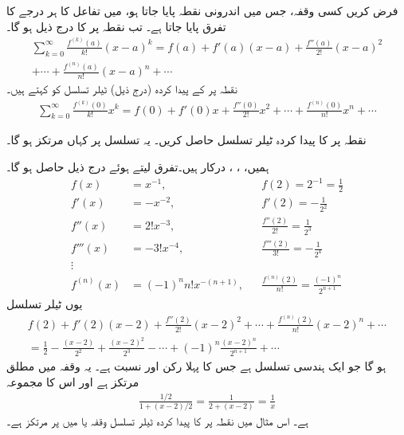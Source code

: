 فرض کریں کسی وقفہ، جس میں اندرونی نقطہ  پایا جاتا ہو، میں تفاعل  کا ہر درجے کا تفرق پایا جاتا ہے۔ تب نقطہ  پر  کا  درج ذیل ہو گا۔
\begin{multline*}
\sum_{k=0}^{\infty}\frac{f^{(k)}(a)}{k!}(x-a)^k=f(a)+f'(a)(x-a)+\frac{f''(a)}{2!}(x-a)^2\\+\cdots+\frac{f^{(n)}(a)}{n!}(x-a)^n+\cdots
\end{multline*}
نقطہ  پر  کے پیدا کردہ (درج ذیل) ٹیلر تسلسل کو   کہتے ہیں۔ 
\begin{align*}
\sum_{k=0}^{\infty}\frac{f^{(k)}(0)}{k!}x^k=f(0)+f'(0)x+\frac{f''(0)}{2!}x^2+\cdots+\frac{f^{(n)}(0)}{n!}x^n+\cdots
\end{align*}

نقطہ  پر  کا پیدا کردہ ٹیلر تسلسل حاصل کریں۔ یہ تسلسل  پر کہاں مرتکز ہو گا۔

ہمیں، ، ،  درکار ہیں۔تفرق لیتے ہوئے درج ذیل حاصل ہو گا۔
\begin{align*}
f(x)&=x^{-1},&&f(2)=2^{-1}=\frac{1}{2}\\
f'(x)&=-x^{-2},&&f'(2)=-\frac{1}{2^2}\\
f''(x)&=2!x^{-3},&&\frac{f''(2)}{2!}=\frac{1}{2^3}\\
f'''(x)&=-3!x^{-4},&&\frac{f'''(2)}{3!}=-\frac{1}{2^4}\\
\vdots &\\
f^{(n)}(x)&=(-1)^nn!x^{-(n+1)},&&\frac{f^{(n)}(2)}{n!}=\frac{(-1)^n}{2^{n+1}}
\end{align*}
یوں ٹیلر تسلسل
\begin{multline*}
f(2)+f'(2)(x-2)+\frac{f''(2)}{2!}(x-2)^2+\cdots+\frac{f^{(n)}(2)}{n!}(x-2)^n+\cdots\\
=\frac{1}{2}-\frac{(x-2)}{2^2}+\frac{(x-2)^2}{2^3}-\cdots+(-1)^n\frac{(x-2)^n}{2^{n+1}}+\cdots
\end{multline*}
ہو گا جو ایک ہندسی تسلسل ہے جس کا پہلا رکن  اور نسبت  ہے۔ یہ وقفہ  میں مطلق مرتکز ہے اور اس کا مجموعہ
\begin{align*}
\frac{1/2}{1+(x-2)/2}=\frac{1}{2+(x-2)}=\frac{1}{x}
\end{align*}
ہے۔ اس مثال میں نقطہ   پر  کا پیدا کردہ ٹیلر تسلسل  وقفہ  یا  میں  پر  مرتکز ہے۔

